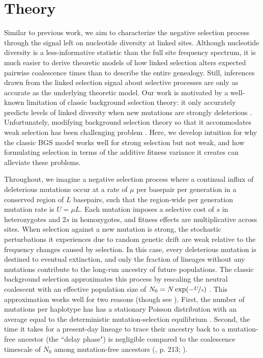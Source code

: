\documentclass[11pt]{article}
\begin{document}
\section*{Theory}

Similar to previous work, we aim to characterize the negative selection process
through the signal left on nucleotide diversity at linked sites. Although
nucleotide diversity is a less-informative statistic than the full site
frequency spectrum, it is much easier to derive theoretic models of how linked
selection alters expected pairwise coalescence times than to describe the
entire genealogy. Still, inferences drawn from the linked selection signal
about selective processes are only as accurate as the underlying theoretic
model. Our work is motivated by a well-known limitation of classic background
selection theory: it only accurately predicts levels of linked diversity when
new mutations are strongly deleterious
\parencite{Charlesworth1993-gb,McVean2000-bt,Good2013-lp,Gordo2002-dr}.
Unfortunately, modifying background selection theory so that it accommodates
weak selection has been challenging problem
\parencite{Good2014-yz,Haigh1978-gt,Higgs1995-xc}. Here, we develop intuition
for why the classic BGS model works well for strong selection but not weak, and
how formulating selection in terms of the additive fitness variance it creates
can alleviate these problems.

Throughout, we imagine a negative selection process where a continual influx of
deleterious mutations occur at a rate of $\mu$ per basepair per generation in a
conserved region of $L$ basepairs, such that the region-wide per generation
mutation rate is $U = \mu L$. Each mutation imposes a selective cost of $s$ in
heterozygotes and $2s$ in homozygotes, and fitness effects are multiplicative
across sites. When selection against a new mutation is strong, the stochastic
perturbations it experiences due to random genetic drift are weak relative to
the frequency changes caused by selection. In this case, every deleterious
mutation is destined to eventual extinction, and only the fraction of lineages
without any mutations contribute to the long-run ancestry of future
populations. The classic background selection approximates this process by
rescaling the neutral coalescent with an effective population size of $N_0 = N
\exp(-\nicefrac{U}{s})$
\parencite{Charlesworth1993-gb,Nordborg1996-nq,Hudson1995-pt,Hudson1994-oh}.
This approximation works well for two reasons (though see
\cite{Cvijovic2018-vd,Walczak2012-fi,Nicolaisen2012-vs}). First, the number of
mutations per haplotype has has a stationary Poisson distribution with an
average equal to the deterministic mutation-selection equilibrium
\parencite{Haldane1927-ga}. Second, the time it takes for a present-day lineage
to trace their ancestry back to a mutation-free ancestor (the ``delay phase")
is negligible compared to the coalescence timescale of $N_0$ among
mutation-free ancestors (\cite{Durrett2008-ql}, p. 213; \cite{Good2014-yz}).
\end{document}
